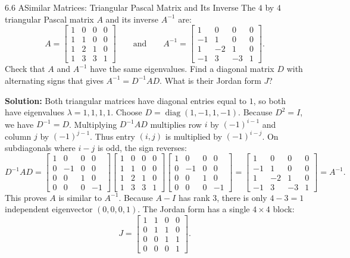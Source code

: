 \documentclass[11pt,a4paper,openany,oneside]{book}
\numberwithin{equation}{chapter}
\begin{document}
\begin{example}{6.6 A}{Similar Matrices: Triangular Pascal Matrix and Its Inverse}
The $4$ by $4$ triangular Pascal matrix $A$ and its inverse $A^{-1}$ are:
\[
A = \begin{bmatrix} 1 & 0 & 0 & 0 \\ 1 & 1 & 0 & 0 \\ 1 & 2 & 1 & 0 \\ 1 & 3 & 3 & 1 \end{bmatrix} \qquad \text{and} \qquad A^{-1} = \begin{bmatrix} 1 & 0 & 0 & 0 \\ -1 & 1 & 0 & 0 \\ 1 & -2 & 1 & 0 \\ -1 & 3 & -3 & 1 \end{bmatrix}.
\]
Check that $A$ and $A^{-1}$ have the same eigenvalues. Find a diagonal matrix $D$ with alternating signs that gives $A^{-1} = D^{-1}AD$. What is their Jordan form $J$?
\end{example}
\textbf{Solution:} Both triangular matrices have diagonal entries equal to $1$, so both have eigenvalues $\lambda = 1, 1, 1, 1$.
Choose $D = \operatorname{diag}(1, -1, 1, -1)$. Because $D^2 = I$, we have $D^{-1} = D$.
Multiplying $D^{-1}AD$ multiplies row $i$ by $(-1)^{i-1}$ and column $j$ by $(-1)^{j-1}$. Thus entry $(i,j)$ is multiplied by $(-1)^{i-j}$. On subdiagonals where $i-j$ is odd, the sign reverses:
\[
D^{-1}AD = \begin{bmatrix} 1 & 0 & 0 & 0 \\ 0 & -1 & 0 & 0 \\ 0 & 0 & 1 & 0 \\ 0 & 0 & 0 & -1 \end{bmatrix}\begin{bmatrix} 1 & 0 & 0 & 0 \\ 1 & 1 & 0 & 0 \\ 1 & 2 & 1 & 0 \\ 1 & 3 & 3 & 1 \end{bmatrix}\begin{bmatrix} 1 & 0 & 0 & 0 \\ 0 & -1 & 0 & 0 \\ 0 & 0 & 1 & 0 \\ 0 & 0 & 0 & -1 \end{bmatrix} = \begin{bmatrix} 1 & 0 & 0 & 0 \\ -1 & 1 & 0 & 0 \\ 1 & -2 & 1 & 0 \\ -1 & 3 & -3 & 1 \end{bmatrix} = A^{-1}.
\]
This proves $A$ is similar to $A^{-1}$. Because $A - I$ has rank $3$, there is only $4-3 = 1$ independent eigenvector $(0,0,0,1)$. The Jordan form has a single $4\times 4$ block:
\[
J = \begin{bmatrix} 1 & 1 & 0 & 0 \\ 0 & 1 & 1 & 0 \\ 0 & 0 & 1 & 1 \\ 0 & 0 & 0 & 1 \end{bmatrix}.
\]
\end{document}

